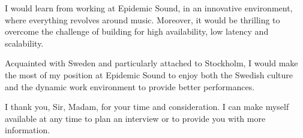 \documentclass[11pt, a4paper]{awesome-cv}
\begin{document}
\begin{cvletter}
    I would learn from working at Epidemic Sound, in an innovative environment, where everything revolves around music.
    Moreover, it would be thrilling to overcome the challenge of building for high availability, low latency and scalability.
    \medskip

    Acquainted with Sweden and particularly attached to Stockholm, I would make the most of my position at Epidemic Sound to enjoy both the Swedish culture
    and the dynamic work environment to provide better performances.
    \medskip

    I thank you, Sir, Madam, for your time and consideration.
    I can make myself available at any time to plan an interview or to provide you with more information.
  \end{cvletter}

  \makeletterclosing
\end{document}

